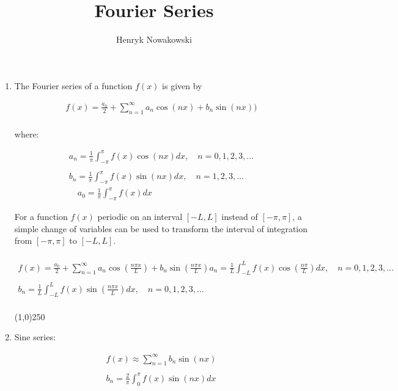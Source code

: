 \documentclass[11pt]{article}
\begin{document}
\author{Henryk Nowakowski}
\title{Fourier Series}
\maketitle




\begin{enumerate}

\item %

	The Fourier series of a function $f(x)$ is given by 


\begin{align*}
f(x) = \frac{a_{0}}{2}+\sum_{n=1}^{\infty} a_{n}\cos(nx) + b_{n}\sin(nx))\\
\end{align*}

where: 

\begin{align*}
a_{n}= \frac{1}{\pi}\int_{-\pi}^{\pi} f(x) \cos(nx) dx,\quad n=0,1,2,3,... \\
\\ b_{n}= \frac{1}{\pi}\int_{-\pi}^{\pi} f(x) \sin(nx) dx, \quad n=1,2,3,... \\
\quad a_{0} = \frac{1}{\pi} \int_{-\pi}^{\pi} f(x) dx
\end{align*}

\newpage

 For a function $f(x)$ periodic on an interval $[-L,L]$ instead of  $[-\pi,\pi]$, a simple change of variables can be used to transform the interval of integration from $[-\pi,\pi]$ to $[-L,L]$.

\begin{align*}
\\ 
f(x) = \frac{a_{0}}{2}+\sum_{n=1}^{\infty} a_{n}\cos(\frac{n \pi x}{L}) + b_{n}\sin(\frac{n \pi x}{L})
a_{n}= \frac{1}{L}\int_{-L}^{L} f(x) \cos(\frac{n\pi}{L}) dx,\quad
n=0,1,2,3,... \\ \\ b_{n}= \frac{1}{L}\int_{-L}^{L} f(x) \sin(\frac{n\pi x}{L}) dx,\quad
n=0,1,2,3,... \\
\end{align*}


\line(1,0){250}
\newpage	
\item 

	Sine series:

\begin{align*}
    f(x) \approx \sum_{n=1}^{\infty} b_{n} \sin(nx) \\ \\
    b_{n} = \frac{2}{\pi} \int_{0}^{\pi} f(x)\sin(nx) dx
\end{align*}


\end{enumerate}
\end{document}
